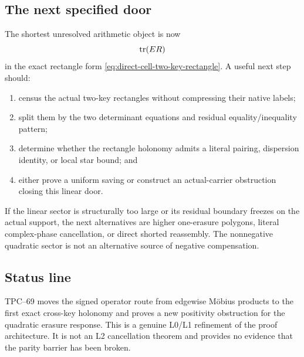 \subsection{The next specified door}

The shortest unresolved arithmetic object is now
\[
 \operatorname{tr}(ER)
\]
in the exact rectangle form
\eqref{eq:direct-cell-two-key-rectangle}.  A useful next step should:
\begin{enumerate}[label=\textup{(\roman*)},leftmargin=3em]
 \item census the actual two-key rectangles without compressing their
       native labels;
 \item split them by the two determinant equations and residual
       equality/inequality pattern;
 \item determine whether the rectangle holonomy admits a literal pairing,
       dispersion identity, or local star bound; and
 \item either prove a uniform saving or construct an actual-carrier
       obstruction closing this linear door.
\end{enumerate}
If the linear sector is structurally too large or its residual boundary
freezes on the actual support, the next alternatives are higher
one-erasure polygons, literal complex-phase cancellation, or direct
shorted reassembly.  The nonnegative quadratic sector is not an alternative
source of negative compensation.

\subsection{Status line}

TPC--69 moves the signed operator route from edgewise Möbius products to the
first exact cross-key holonomy and proves a new positivity obstruction for
the quadratic erasure response.  This is a genuine L0/L1 refinement of the
proof architecture.  It is not an L2 cancellation theorem and provides no
evidence that the parity barrier has been broken.
